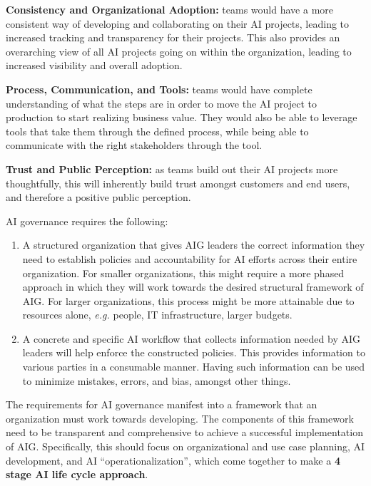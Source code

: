 \documentclass{article}
\begin{document}
\textbf{Consistency and Organizational Adoption:} teams would have a more consistent way of developing and collaborating on their AI projects, leading to increased tracking and transparency for their projects. This also provides an overarching view of all AI projects going on within the organization, leading to increased visibility and overall adoption.

\textbf{Process, Communication, and Tools:} teams would have complete understanding of what the steps are in order to move the AI project to production to start realizing business value. They would also be able to leverage tools that take them through the defined process, while being able to communicate with the right stakeholders through the tool.

\textbf{Trust and Public Perception:} as teams build out their AI projects more thoughtfully, this will inherently build trust amongst customers and end users, and therefore a positive public perception.

AI governance requires the following: 

\begin{enumerate}
\item A structured organization that gives AIG leaders the correct information they need to establish policies and accountability for AI efforts across their entire organization. For smaller organizations, this might require a more phased approach in which they will work towards the desired structural framework of AIG. For larger organizations, this process might be more attainable due to resources alone, \emph{e.g.} people, IT infrastructure, larger budgets.

\item A concrete and specific AI workflow that collects information needed by AIG leaders will help enforce the constructed policies. This provides information to various parties in a consumable manner. Having such information can be used to minimize mistakes, errors, and bias, amongst other things.
\end{enumerate}


The requirements for AI governance manifest into a framework that an organization must work towards developing. The components of this framework need to be transparent and comprehensive to achieve a successful implementation of AIG. Specifically, this should focus on organizational and use case planning, AI development, and AI ``operationalization'', which come together to make a \textbf{4 stage AI life cycle approach}.
\end{document}
